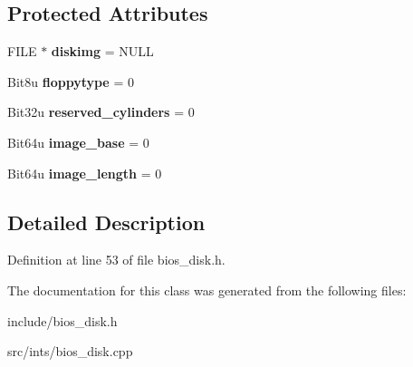 \subsection*{Protected Attributes}
\begin{DoxyCompactItemize}
\item 
\hypertarget{classimageDisk_a97c3a05f12f94a92cf6ddac3f2a5dc5b}{F\-I\-L\-E $\ast$ {\bfseries diskimg} = N\-U\-L\-L}\label{classimageDisk_a97c3a05f12f94a92cf6ddac3f2a5dc5b}

\item 
\hypertarget{classimageDisk_a6e6e4381d5627cb1516a6ced5e1a0b67}{Bit8u {\bfseries floppytype} = 0}\label{classimageDisk_a6e6e4381d5627cb1516a6ced5e1a0b67}

\item 
\hypertarget{classimageDisk_a6588490a427230feac862942f34e401b}{Bit32u {\bfseries reserved\-\_\-cylinders} = 0}\label{classimageDisk_a6588490a427230feac862942f34e401b}

\item 
\hypertarget{classimageDisk_aa12b7c8c8b8bc9745dd93a10d13d89b9}{Bit64u {\bfseries image\-\_\-base} = 0}\label{classimageDisk_aa12b7c8c8b8bc9745dd93a10d13d89b9}

\item 
\hypertarget{classimageDisk_a97b1733c20d7a8e9a7479b268f75f074}{Bit64u {\bfseries image\-\_\-length} = 0}\label{classimageDisk_a97b1733c20d7a8e9a7479b268f75f074}

\end{DoxyCompactItemize}


\subsection{Detailed Description}


Definition at line 53 of file bios\-\_\-disk.\-h.



The documentation for this class was generated from the following files\-:\begin{DoxyCompactItemize}
\item 
include/bios\-\_\-disk.\-h\item 
src/ints/bios\-\_\-disk.\-cpp\end{DoxyCompactItemize}
